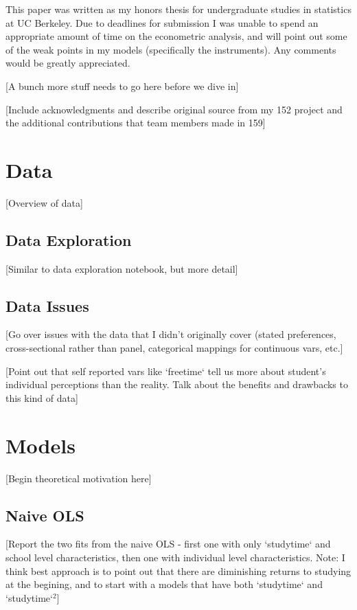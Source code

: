\documentclass[12pt]{article}
\begin{document}
This paper was written as my honors thesis for undergraduate studies in statistics at UC Berkeley. Due to deadlines for submission I was unable to spend an appropriate amount of time on the econometric analysis, and will point out some of the weak points in my models (specifically the instruments). Any comments would be greatly appreciated.

[A bunch more stuff needs to go here before we dive in]

[Include acknowledgments and describe original source from my 152 project and the additional contributions that team members made in 159]

\newpage
\section{Data}
[Overview of data]

\subsection{Data Exploration}
[Similar to data exploration notebook, but more detail]

\subsection{Data Issues}
[Go over issues with the data that I didn't originally cover (stated preferences, cross-sectional rather than panel, categorical mappings for continuous vars, etc.]

[Point out that self reported vars like `freetime` tell us more about student's individual perceptions than the reality. Talk about the benefits and drawbacks to this kind of data]


\newpage
\section{Models}
[Begin theoretical motivation here]

\subsection{Naive OLS}
[Report the two fits from the naive OLS - first one with only `studytime` and school level characteristics, then one with individual level characteristics. Note: I think best approach is to point out that there are diminishing returns to studying at the begining, and to start with a models that have both `studytime` and `studytime`$^2$]
\end{document}
